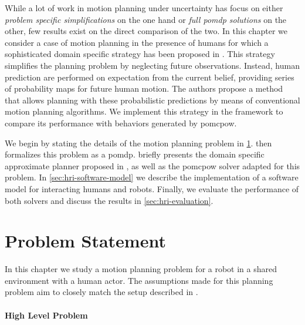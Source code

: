 While a lot of work in motion planning under uncertainty has focus on either
\emph{problem specific simplifications} on the one hand or \emph{full
\ac{pomdp} solutions} on the other, few results exist on the direct comparison
of the two. In this chapter we consider a case of motion planning in the
presence of humans for which a sophisticated domain specific strategy has been
proposed in \cite{fisac2018probabilistically}. This strategy simplifies the
planning problem by neglecting future observations. Instead, human prediction
are performed on expectation from the current belief, providing series of
probability maps for future human motion. The authors propose a method that
allows planning with these probabilistic predictions by means of conventional
motion planning algorithms. We implement this strategy in the \pomdpsjl
framework to compare its performance with behaviors generated by
\ac{pomcpow}.

We begin by stating the details of the motion planning problem in
\cref{sec:hri-problem-statement}.  then
formalizes this problem as a \ac{pomdp}.  briefly
presents the domain specific approximate planner proposed in
\cite{fisac2018probabilistically}, as well as the \ac{pomcpow} solver adapted
for this problem. In \cref{sec:hri-software-model} we describe the
implementation of a software model for interacting humans and robots. Finally,
we evaluate the performance of both solvers and discuss the results in
\cref{sec:hri-evaluation}.

\section{Problem Statement}\label{sec:hri-problem-statement}

In this chapter we study a motion planning problem for a robot in a shared
environment with a human actor. The assumptions made for this planning problem
aim to closely match the setup described in \cite{fisac2018probabilistically}.

\paragraph{High Level Problem}

